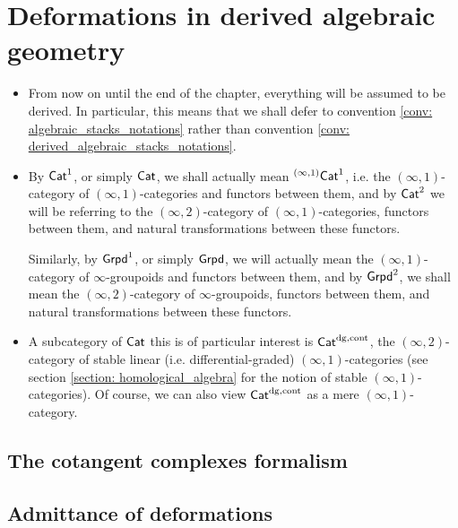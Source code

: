     \section{Deformations in derived algebraic geometry}
        \begin{convention} \label{conv: deformation_theory_everything_is_derived}
            \noindent
            \begin{itemize}
                \item From now on until the end of the chapter, everything will be assumed to be derived. In particular, this means that we shall defer to convention \ref{conv: algebraic_stacks_notations} rather than convention \ref{conv: derived_algebraic_stacks_notations}.
                \item By $\mathsf{Cat}^1$, or simply $\mathsf{Cat}$, we shall actually mean ${}^{(\infty, 1)}\mathsf{Cat}^1$, i.e. the $(\infty, 1)$-category of $(\infty, 1)$-categories and functors between them, and by $\mathsf{Cat}^2$ we will be referring to the $(\infty, 2)$-category of $(\infty, 1)$-categories, functors between them, and natural transformations between these functors. 
                
                Similarly, by $\mathsf{Grpd}^1$, or simply $\mathsf{Grpd}$, we will actually mean the $(\infty, 1)$-category of $\infty$-groupoids and functors between them, and by $\mathsf{Grpd}^2$, we shall mean the $(\infty, 2)$-category of $\infty$-groupoids, functors between them, and natural transformations between these functors.
                \item A subcategory of $\mathsf{Cat}$ this is of particular interest is $\mathsf{Cat}^{\mathrm{dg}, \mathrm{cont}}$, the $(\infty, 2)$-category of stable linear (i.e. differential-graded) $(\infty, 1)$-categories (see section \ref{section: homological_algebra} for the notion of stable $(\infty, 1)$-categories). Of course, we can also view $\mathsf{Cat}^{\mathrm{dg}, \mathrm{cont}}$ as a mere $(\infty, 1)$-category.
            \end{itemize}
        \end{convention}
    
        \subsection{The cotangent complexes formalism}
        
        \subsection{Admittance of deformations}
            
